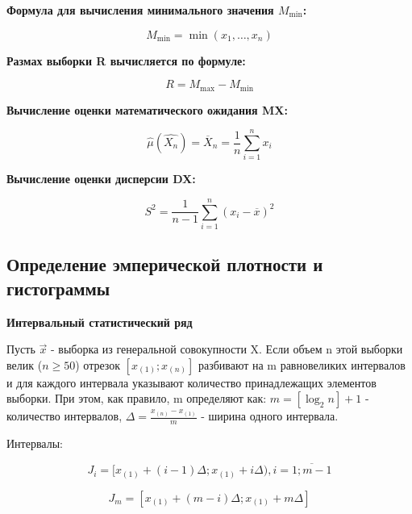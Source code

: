\documentclass[12pt, a4paper]{report}
\begin{document}
	\textbf{Формула для вычисления минимального значения $M_{\min}$:}
	
	\begin{equation*} \label{Mmin}
	M_{\min} = \min{(x_1, \dots, x_n)}
	\end{equation*}
	
	\textbf{Размах выборки R вычисляется по формуле:}
	
	\begin{equation*} \label{R}
	R = M_{\max} - M_{\min}
	\end{equation*}
	
	\textbf{Вычисление оценки математического ожидания MX:}
	
	\begin{equation*}
	\hat{\mu}(\hat{X_n}) = \overline{X}_n = \frac{1}{n}\sum_{i=1}^{n} x_i
	\end{equation*}
	
	\textbf{Вычисление оценки дисперсии DX:}
	
	\begin{equation*}
	S^2 = \frac{1}{n-1} \sum_{i=1}^n (x_i - \overline{x})^2
	\end{equation*}
	
	\vspace{0.5cm}
	\subsection{Определение эмперической плотности и гистограммы}
	
	\hspace{0.5cm} \textbf{Интервальный статистический ряд}
	
	Пусть $\vec{x}$ - выборка из генеральной совокупности X. Если объем n этой выборки велик ($n\geq50$) отрезок $[x_{(1)}; x_{(n)}]$ разбивают на m равновеликих интервалов и для каждого интервала указывают количество принадлежащих элементов выборки. При этом, как правило, m определяют как:  $m = [\log_2n] + 1$ - количество интервалов, $\Delta = \frac{x_{(n)} - x_{(1)}}{m}$ - ширина одного интервала.
	
	Интервалы: 
	
	\begin{equation*}
	J_i = [   x_{(1)}  + (i-1)\Delta; x_{(1)} + i\Delta  ), i = \overline{1;m-1}
	\end{equation*}
	
	\begin{equation*}
	J_m = [   x_{(1)}  + (m-i)\Delta; x_{(1)} + m\Delta    ]
	\end{equation*}
	
\end{document}
